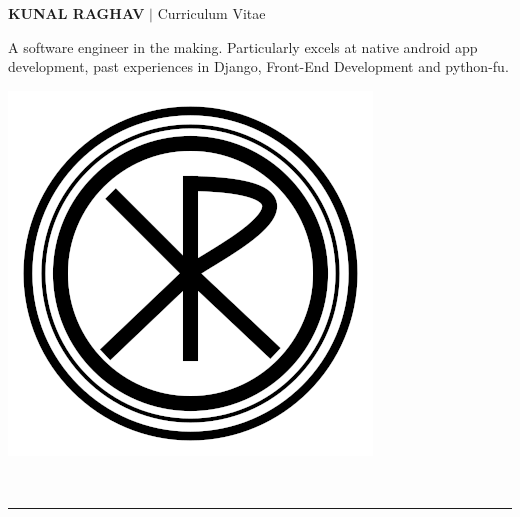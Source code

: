 \documentclass[8pt,a4paper]{extarticle}
\begin{document}
\thispagestyle{alim}
\noindent
\begin{minipage}{0.6\textwidth}
	\begin{Huge}
		{
		\color{resumeBlueLight}
			\bfseries{KUNAL RAGHAV} 
		}$|$ {\color{gray}Curriculum Vitae}\\					
	\end{Huge}
	\begin{flushleft}
		A software engineer in the making. Particularly excels at native android app development, past
		experiences in Django, Front-End Development and python-fu.
	\end{flushleft}
\end{minipage}
\hfill
\begin{minipage}{0.2\textwidth}
	\includegraphics[width=\textwidth]{photo}
\end{minipage}
\\
{\color{gray}\rule{\textwidth}{0.5mm}}
\\ 
\end{document}
